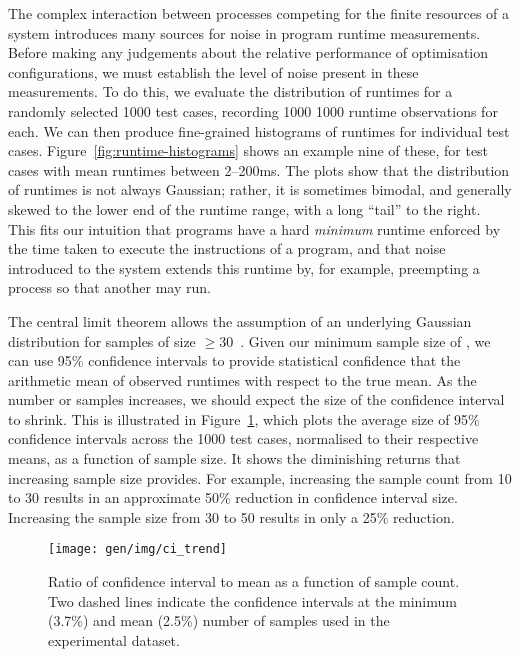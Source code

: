 The complex interaction between processes competing for the finite
resources of a system introduces many sources for noise in program
runtime measurements. Before making any judgements about the relative
performance of optimisation configurations, we must establish the
level of noise present in these measurements. To do this, we evaluate
the distribution of runtimes for a randomly selected 1000 test cases,
recording 1000 1000 runtime observations for each. We can then produce
fine-grained histograms of runtimes for individual test
cases. Figure~\ref{fig:runtime-histograms} shows an example nine of
these, for test cases with mean runtimes between 2--200ms. The plots
show that the distribution of runtimes is not always Gaussian; rather,
it is sometimes bimodal, and generally skewed to the lower end of the
runtime range, with a long ``tail'' to the right. This fits our
intuition that programs have a hard \emph{minimum} runtime enforced by
the time taken to execute the instructions of a program, and that
noise introduced to the system extends this runtime by, for example,
preempting a process so that another may run.

The central limit theorem allows the assumption of an underlying
Gaussian distribution for samples of size $\ge 30$~\cite{Georges2007}.
Given our minimum sample size of , we can
use 95\% confidence intervals to provide statistical confidence that
the arithmetic mean of observed runtimes with respect to the true
mean. As the number or samples increases, we should expect the size of
the confidence interval to shrink. This is illustrated in
Figure~\ref{fig:ci-trends}, which plots the average size of 95\%
confidence intervals across the 1000 test cases, normalised to their
respective means, as a function of sample size. It shows the
diminishing returns that increasing sample size provides. For example,
increasing the sample count from 10 to 30 results in an approximate
50\% reduction in confidence interval size. Increasing the sample size
from 30 to 50 results in only a 25\% reduction.

\begin{figure}
\centering
\texttt{[image: gen/img/ci\_trend]}
\caption{%
  Ratio of confidence interval to mean as a function of sample
  count. Two dashed lines indicate the confidence intervals at the
  minimum (3.7\%) and mean (2.5\%) number of samples used in the
  experimental dataset.%
}
\label{fig:ci-trends}
\end{figure}


